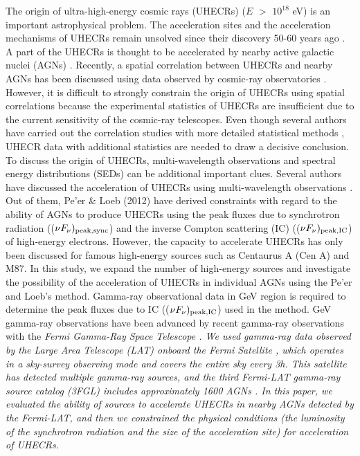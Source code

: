 \documentclass{aastex6}
\begin{document}
The origin of ultra-high-energy cosmic rays (UHECRs) ($E$ $>$ $10^{18}$ eV) is an important astrophysical problem.
The acceleration sites and the acceleration mechanisms of UHECRs remain unsolved since their discovery 50-60 years ago \citep{UHECR}.
A part of the UHECRs is thought to be accelerated by nearby active galactic nuclei (AGNs) \citep[e.g.,][]{AGN,AGN2}.
Recently, a spatial correlation between UHECRs and nearby AGNs has been discussed using data observed by cosmic-ray observatories \citep[e.g.,][]{Auger,TA}.
However, it is difficult to strongly constrain the origin of UHECRs using spatial correlations because the experimental statistics of UHECRs are insufficient due to the current sensitivity of the cosmic-ray telescopes.
Even though several authors have carried out the correlation studies with more detailed statistical methods \citep[e.g.,][]{AGN3, AGN4}, UHECR data with additional statistics are needed to draw a decisive conclusion.
To discuss the origin of UHECRs, multi-wavelength observations and spectral energy distributions (SEDs) can be additional important clues.
Several authors have discussed the acceleration of UHECRs using multi-wavelength observations \citep[e.g.,][]{Murase, PL, TeV}.
Out of them, Pe'er \& Loeb (2012) have derived constraints with regard to the ability of AGNs to produce UHECRs using the peak fluxes due to synchrotron radiation (($\nu F_{\nu})_{\rm{peak, sync}}$) and the inverse Compton scattering (IC) (($\nu F_{\nu})_{\rm{peak, IC}}$) of high-energy electrons.
However, the capacity to accelerate UHECRs has only been discussed for famous high-energy sources such as Centaurus A (Cen A) and M87.
In this study, we expand the number of high-energy sources and investigate the possibility of the acceleration of UHECRs in individual AGNs using the Pe'er and Loeb's method.
Gamma-ray observational data in GeV region is required to determine the peak fluxes due to IC (($\nu F_{\nu})_{\rm{peak, IC}}$) used in the method.
GeV gamma-ray observations have been advanced by recent gamma-ray observations with the \it{Fermi}\rm{} Gamma-Ray Space Telescope \citep[ and references therein]{Massaro}.
We used gamma-ray data observed by the Large Area Telescope (LAT) onboard the \it{Fermi}\rm{} Satellite \citep{Atwood}, which operates in a sky-survey observing mode and covers the entire sky every 3h.
This satellite has detected multiple gamma-ray sources, and the third \it{Fermi}\rm{}-LAT gamma-ray source catalog (3FGL) includes approximately 1600 AGNs \citep{Fermi, 3LAC}.
In this paper, we evaluated the ability of sources to accelerate UHECRs in nearby AGNs detected by the \it{Fermi}\rm{}-LAT, and then we constrained the physical conditions (the luminosity of the synchrotron radiation and the size of the acceleration site) for acceleration of UHECRs.
\end{document}
